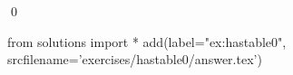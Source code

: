 
\begin{ex} 
  \label{ex:hastable0}
  
  \qed
\end{ex} 
\begin{python0}
from solutions import *
add(label="ex:hastable0",
    srcfilename='exercises/hastable0/answer.tex') 
\end{python0}
